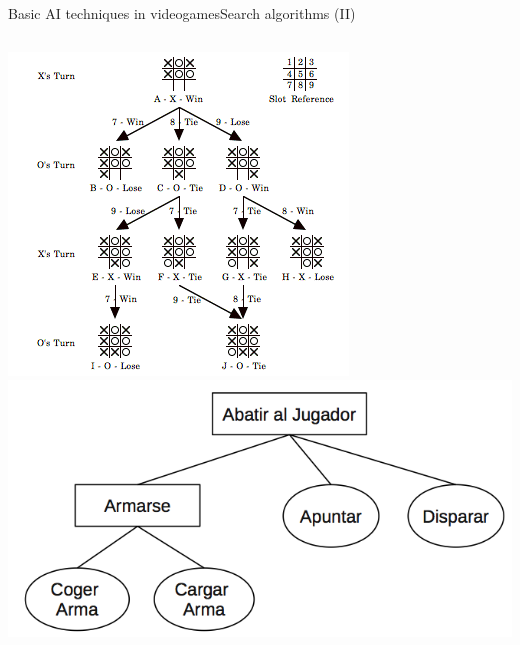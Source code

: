\documentclass[10pt,compress]{beamer} %
\begin{document}
\begin{frame}{Basic AI techniques in videogames}{Search algorithms (II)}
    \begin{columns}
		\centering\includegraphics[width=\linewidth]{figs/tree}
		\includegraphics[width=\linewidth]{figs/tree2}
	\end{columns}
\end{frame}
\end{document}
